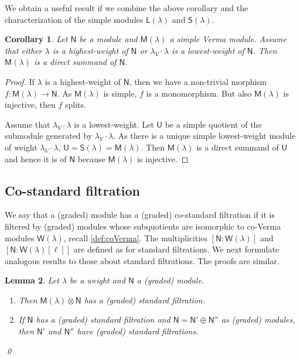 \documentclass[reqno]{amsart}
\renewcommand{\_}[1]{_{\left( #1 \right)}}
\renewcommand{\^}[1]{^{\left( #1 \right)}}
\newcommand{\ot}{{\otimes}}
\newcommand\fL{\mathsf{L}}
\newcommand\fM{\mathsf{M}}
\newcommand\fN{\mathsf{N}}
\newcommand\fS{\mathsf{S}}
\newcommand\fU{\mathsf{U}}
\newcommand\fW{\mathsf{W}}
\theoremstyle{plain}
\newtheorem{lema}{Lemma}[section]
\newtheorem{cor}[lema]{Corollary}
\theoremstyle{definition}
\theoremstyle{remark}
\begin{document}
We obtain a useful result if we combine the above corollary and the characterization of the simple modules $\fL(\lambda)$ and $\fS(\lambda)$.

\begin{cor}
Let $\fN$ be a module and $\fM(\lambda)$ a simple Verma module. Assume that either $\lambda$ is a highest-weight of $\fN$ or $\lambda_V\cdot\lambda$ is a lowest-weight of $\fN$. Then $\fM(\lambda)$ is a direct summand of $\fN$.
\end{cor}

\begin{proof}
If $\lambda$ is a highest-weight of $\fN$, then we have a non-trivial morphism $f:\fM(\lambda)\rightarrow\fN$. As $\fM(\lambda)$ is simple, $f$ is a monomorphism. But also $\fM(\lambda)$ is injective, then $f$ splits. 

Assume that $\lambda_V\cdot\lambda$ is a lowest-weight. Let $\fU$ be a simple quotient of the submodule generated by $\lambda_V\cdot\lambda$. As there is a unique simple lowest-weight module of weight $\lambda_V\cdot\lambda$, $\fU=\fS(\lambda)=\fM(\lambda)$. Then $\fM(\lambda)$ is a direct summand of $\fU$ and hence it is of $\fN$ because $\fM(\lambda)$ is injective.
\end{proof}


\subsection{Co-standard filtration}

We say that a (graded) module has a (graded) co-standard filtration if it is filtered by (graded) modules whose subquotients are isomorphic to co-Verma modules $\fW(\lambda)$, recall \eqref{def:coVerma}. The multiplicities $[\fN:\fW(\lambda)]$ and $[\fN:\fW(\lambda)[\ell]]$ are defined as for standard filtrations. We next formulate analogous results to those about standard filtrations. The proofs are similar.

\begin{lema}\label{le:para co-standard filt}
Let $\lambda$ be a weight and $\fN$ a (graded) module. 
\begin{enumerate}[label=(\roman*)]
\item Then $\fM(\lambda)\ot\fN$ has a (graded) standard filtration. 
\item If $\fN$ has a (graded) standard filtration and $\fN=\fN'\oplus\fN''$ as (graded) modules, then $\fN'$ and $\fN''$ have (graded) standard filtrations.
\end{enumerate}
\qed
\end{lema}
\end{document}
